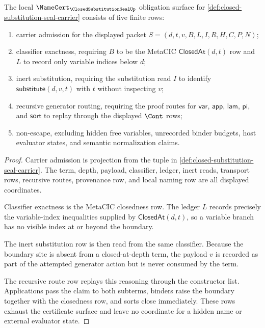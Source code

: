 \begin{theorem}
\label{thm:closed-substitution-seal-namecert-obligations}
The local $\NameCert_{\ClosedSubstitutionSealUp}$ obligation surface for \autoref{def:closed-substitution-seal-carrier} consists of five finite rows:
\begin{enumerate}
\item carrier admission for the displayed packet $S=(d,t,v,B,L,I,R,H,C,P,N)$;
\item classifier exactness, requiring $B$ to be the MetaCIC $\mathsf{ClosedAt}(d,t)$ row and $L$ to record only variable indices below $d$;
\item inert substitution, requiring the substitution read $I$ to identify $\mathsf{substitute}(d,v,t)$ with $t$ without inspecting $v$;
\item recursive generator routing, requiring the proof routes for $\mathsf{var}$, $\mathsf{app}$, $\mathsf{lam}$, $\mathsf{pi}$, and $\mathsf{sort}$ to replay through the displayed $\Cont$ rows;
\item non-escape, excluding hidden free variables, unrecorded binder budgets, host evaluator states, and semantic normalization claims.
\end{enumerate}
\end{theorem}
\begin{proof}
Carrier admission is projection from the tuple in \autoref{def:closed-substitution-seal-carrier}. The term, depth, payload, classifier, ledger, inert reads, transport rows, recursive routes, provenance row, and local naming row are all displayed coordinates.

Classifier exactness is the MetaCIC closedness row. The ledger $L$ records precisely the variable-index inequalities supplied by $\mathsf{ClosedAt}(d,t)$, so a variable branch has no visible index at or beyond the boundary.

The inert substitution row is then read from the same classifier. Because the boundary site is absent from a closed-at-depth term, the payload $v$ is recorded as part of the attempted generator action but is never consumed by the term.

The recursive route row replays this reasoning through the constructor list. Applications pass the claim to both subterms, binders raise the boundary together with the closedness row, and sorts close immediately. These rows exhaust the certificate surface and leave no coordinate for a hidden name or external evaluator state.
\end{proof}

